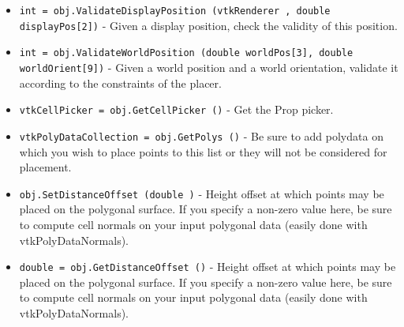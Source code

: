 \begin{itemize}
\item  \verb|int = obj.ValidateDisplayPosition (vtkRenderer , double displayPos[2])| -  Given a display position, check the validity of this position.

\item  \verb|int = obj.ValidateWorldPosition (double worldPos[3], double worldOrient[9])| -  Given a world position and a world orientation,
 validate it according to the constraints of the placer.

\item  \verb|vtkCellPicker = obj.GetCellPicker ()| -  Get the Prop picker.

\item  \verb|vtkPolyDataCollection = obj.GetPolys ()| -  Be sure to add polydata on which you wish to place points to this list
 or they will not be considered for placement.

\item  \verb|obj.SetDistanceOffset (double )| -  Height offset at which points may be placed on the polygonal surface.
 If you specify a non-zero value here, be sure to compute cell normals
 on your input polygonal data (easily done with vtkPolyDataNormals).

\item  \verb|double = obj.GetDistanceOffset ()| -  Height offset at which points may be placed on the polygonal surface.
 If you specify a non-zero value here, be sure to compute cell normals
 on your input polygonal data (easily done with vtkPolyDataNormals).

\end{itemize}
